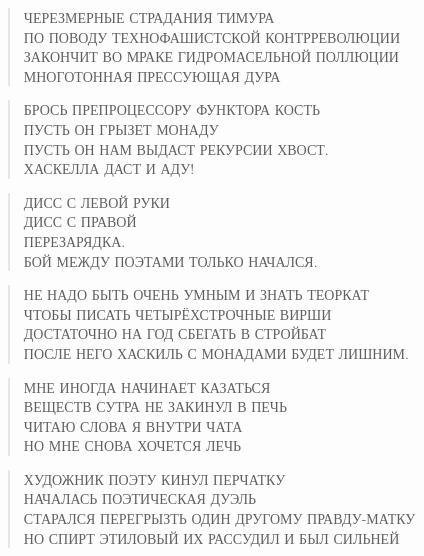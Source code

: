 \poemtitle{***}
\begin{verse}
ЧЕРЕЗМЕРНЫЕ СТРАДАНИЯ ТИМУРА\\
ПО ПОВОДУ ТЕХНОФАШИСТСКОЙ КОНТРРЕВОЛЮЦИИ\\
ЗАКОНЧИТ ВО МРАКЕ ГИДРОМАСЕЛЬНОЙ ПОЛЛЮЦИИ\\
МНОГОТОННАЯ ПРЕССУЮЩАЯ ДУРА
\end{verse}

\poemtitle{***}
\begin{verse}
БРОСЬ ПРЕПРОЦЕССОРУ ФУНКТОРА КОСТЬ\\
ПУСТЬ ОН ГРЫЗЕТ МОНАДУ\\
ПУСТЬ ОН НАМ ВЫДАСТ РЕКУРСИИ ХВОСТ.\\
ХАСКЕЛЛА ДАСТ И АДУ!
\end{verse}

\poemtitle{***}
\begin{verse}
ДИСС С ЛЕВОЙ РУКИ\\
ДИСС С ПРАВОЙ\\
ПЕРЕЗАРЯДКА.\\
БОЙ МЕЖДУ ПОЭТАМИ ТОЛЬКО НАЧАЛСЯ.
\end{verse}

\poemtitle{***}
\begin{verse}
НЕ НАДО БЫТЬ ОЧЕНЬ УМНЫМ И ЗНАТЬ ТЕОРКАТ\\
ЧТОБЫ ПИСАТЬ ЧЕТЫРЁХСТРОЧНЫЕ ВИРШИ\\
ДОСТАТОЧНО НА ГОД СБЕГАТЬ В СТРОЙБАТ\\
ПОСЛЕ НЕГО ХАСКИЛЬ С МОНАДАМИ БУДЕТ ЛИШНИМ.
\end{verse}

\poemtitle{***}
\begin{verse}
МНЕ ИНОГДА НАЧИНАЕТ КАЗАТЬСЯ\\
ВЕЩЕСТВ СУТРА НЕ ЗАКИНУЛ В ПЕЧЬ\\
ЧИТАЮ СЛОВА Я ВНУТРИ ЧАТА\\
НО МНЕ СНОВА ХОЧЕТСЯ ЛЕЧЬ
\end{verse}

\poemtitle{***}
\begin{verse}
ХУДОЖНИК ПОЭТУ КИНУЛ ПЕРЧАТКУ\\
НАЧАЛАСЬ ПОЭТИЧЕСКАЯ ДУЭЛЬ\\
СТАРАЛСЯ ПЕРЕГРЫЗТЬ ОДИН ДРУГОМУ ПРАВДУ-МАТКУ\\
НО СПИРТ ЭТИЛОВЫЙ ИХ РАССУДИЛ И БЫЛ СИЛЬНЕЙ
\end{verse}

